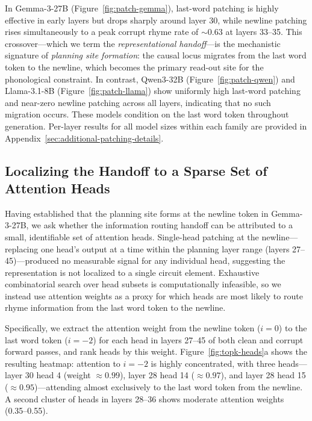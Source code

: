 \documentclass{article}
\begin{document}
In Gemma-3-27B (Figure~\ref{fig:patch-gemma}), last-word patching is highly effective in early layers but drops sharply around layer 30, while newline patching rises simultaneously to a peak corrupt rhyme rate of ${\sim}0.63$ at layers 33--35. This crossover---which we term the \textit{representational handoff}---is the mechanistic signature of \textit{planning site formation}: the causal locus migrates from the last word token to the newline, which becomes the primary read-out site for the phonological constraint. In contrast, Qwen3-32B (Figure~\ref{fig:patch-qwen}) and Llama-3.1-8B (Figure~\ref{fig:patch-llama}) show uniformly high last-word patching and near-zero newline patching across all layers, indicating that no such migration occurs. These models condition on the last word token throughout generation. Per-layer results for all model sizes within each family are provided in Appendix~\ref{sec:additional-patching-details}.

\subsection{Localizing the Handoff to a Sparse Set of Attention Heads}
\label{sec:head-patching}

Having established that the planning site forms at the newline token in Gemma-3-27B, we ask whether the information routing handoff can be attributed to a small, identifiable set of attention heads. Single-head patching at the newline---replacing one head's output at a time within the planning layer range (layers 27--45)---produced no measurable signal for any individual head, suggesting the representation is not localized to a single circuit element. Exhaustive combinatorial search over head subsets is computationally infeasible, so we instead use attention weights as a proxy for which heads are most likely to route rhyme information from the last word token to the newline.

Specifically, we extract the attention weight from the newline token ($i=0$) to the last word token ($i=-2$) for each head in layers 27--45 of both clean and corrupt forward passes, and rank heads by this weight. Figure~\ref{fig:topk-heads}a shows the resulting heatmap: attention to $i=-2$ is highly concentrated, with three heads---layer 30 head 4 (weight ${\approx}0.99$), layer 28 head 14 (${\approx}0.97$), and layer 28 head 15 (${\approx}0.95$)---attending almost exclusively to the last word token from the newline. A second cluster of heads in layers 28--36 shows moderate attention weights (0.35--0.55).
\end{document}
